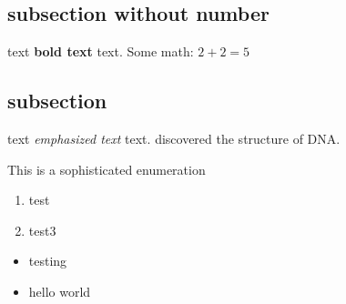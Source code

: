 \subsection*{subsection without number}
text \textbf{bold text} text. Some math: $2+2=5$
\subsection{subsection}
text \emph{emphasized text} text. \cite{WC:1953}
discovered the structure of DNA.

This is a sophisticated enumeration

\begin{enumerate}
\item{test}
\item{test3}
\end{enumerate}

\begin{itemize}
	\item testing
	\item hello world
\end{itemize}